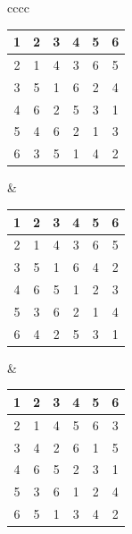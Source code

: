 \begin{center}
\begin{tabular}{cccc}
\begin{tabular}{|c@{\hspace{1.5mm}}|c@{\hspace{1.5mm}}|c@{\hspace{1.5mm}}
|c@{\hspace{1.5mm}}|c@{\hspace{1.5mm}}|c@{\hspace{1.5mm}}|} \hline
1&2&3&4&5&6  \\ \hline
2&1&4&3&6&5  \\ \hline
3&5&1&6&2&4  \\ \hline
4&6&2&5&3&1  \\ \hline
5&4&6&2&1&3  \\ \hline
6&3&5&1&4&2  \\ \hline
\end{tabular} & 
\begin{tabular}{|c@{\hspace{1.5mm}}|c@{\hspace{1.5mm}}|c@{\hspace{1.5mm}}
|c@{\hspace{1.5mm}}|c@{\hspace{1.5mm}}|c@{\hspace{1.5mm}}|} \hline
1&2&3&4&5&6  \\ \hline
2&1&4&3&6&5  \\ \hline
3&5&1&6&4&2  \\ \hline
4&6&5&1&2&3  \\ \hline
5&3&6&2&1&4  \\ \hline
6&4&2&5&3&1  \\ \hline
\end{tabular} & 
\begin{tabular}{|c@{\hspace{1.5mm}}|c@{\hspace{1.5mm}}|c@{\hspace{1.5mm}}
|c@{\hspace{1.5mm}}|c@{\hspace{1.5mm}}|c@{\hspace{1.5mm}}|} \hline
1&2&3&4&5&6  \\ \hline
2&1&4&5&6&3  \\ \hline
3&4&2&6&1&5  \\ \hline
4&6&5&2&3&1  \\ \hline
5&3&6&1&2&4  \\ \hline
6&5&1&3&4&2  \\ \hline

\end{tabular}
\end{tabular}
\end{center}
